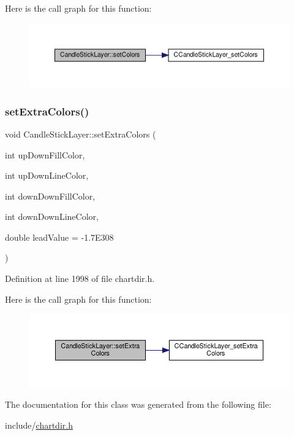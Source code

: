 Here is the call graph for this function\+:
\nopagebreak
\begin{figure}[H]
\begin{center}
\leavevmode
\includegraphics[width=350pt]{class_candle_stick_layer_a7c5dfc382c750c6c1f358254d3ab7751_cgraph}
\end{center}
\end{figure}
\mbox{\label{class_candle_stick_layer_aea51bb1fa87f27d6867dda9c00a917eb}} 
\subsubsection{\texorpdfstring{set\+Extra\+Colors()}{setExtraColors()}}
{\footnotesize\ttfamily void Candle\+Stick\+Layer\+::set\+Extra\+Colors (\begin{DoxyParamCaption}\item[{int}]{up\+Down\+Fill\+Color,  }\item[{int}]{up\+Down\+Line\+Color,  }\item[{int}]{down\+Down\+Fill\+Color,  }\item[{int}]{down\+Down\+Line\+Color,  }\item[{double}]{lead\+Value = {\ttfamily -\/1.7E308} }\end{DoxyParamCaption})\hspace{0.3cm}{\ttfamily [inline]}}



Definition at line 1998 of file chartdir.\+h.

Here is the call graph for this function\+:
\nopagebreak
\begin{figure}[H]
\begin{center}
\leavevmode
\includegraphics[width=350pt]{class_candle_stick_layer_aea51bb1fa87f27d6867dda9c00a917eb_cgraph}
\end{center}
\end{figure}


The documentation for this class was generated from the following file\+:\begin{DoxyCompactItemize}
\item 
include/\hyperlink{chartdir_8h}{chartdir.\+h}\end{DoxyCompactItemize}
